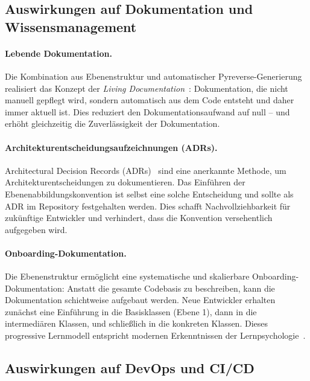 ﻿\documentclass[a4paper,12pt]{article}
\begin{document}
\subsection{Auswirkungen auf Dokumentation und Wissensmanagement}

\paragraph{Lebende Dokumentation.}
Die Kombination aus Ebenenstruktur und automatischer Pyreverse-Generierung
realisiert das Konzept der \textit{Living Documentation}~\cite{martraire2019}:
Dokumentation, die nicht manuell gepflegt wird, sondern automatisch aus dem
Code entsteht und daher immer aktuell ist. Dies reduziert den Dokumentationsaufwand
auf null -- und erhöht gleichzeitig die Zuverlässigkeit der Dokumentation.

\paragraph{Architekturentscheidungsaufzeichnungen (ADRs).}
Architectural Decision Records (ADRs)~\cite{nygard2011} sind eine anerkannte
Methode, um Architekturentscheidungen zu dokumentieren. Das Einführen der
Ebenenabbildungskonvention ist selbst eine solche Entscheidung und sollte als ADR
im Repository festgehalten werden. Dies schafft Nachvollziehbarkeit für zukünftige
Entwickler und verhindert, dass die Konvention versehentlich aufgegeben wird.

\paragraph{Onboarding-Dokumentation.}
Die Ebenenstruktur ermöglicht eine systematische und skalierbare
Onboarding-Dokumentation: Anstatt die gesamte Codebasis zu beschreiben, kann
die Dokumentation schichtweise aufgebaut werden. Neue Entwickler erhalten zunächst
eine Einführung in die Basisklassen (Ebene 1), dann in die intermediären Klassen,
und schließlich in die konkreten Klassen. Dieses progressive Lernmodell
entspricht modernen Erkenntnissen der Lernpsychologie~\cite{vygotsky1978}.

\subsection{Auswirkungen auf DevOps und CI/CD}
\end{document}
